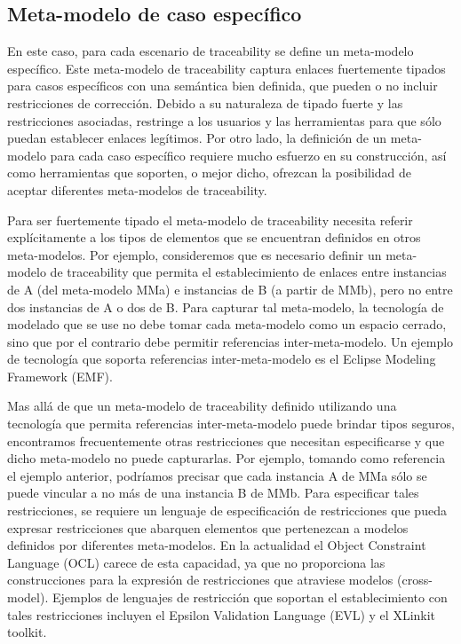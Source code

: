 \documentclass[a4paper,12pt,oneside]{book}
\begin{document}
\subsection{Meta-modelo de caso específico}

En este caso, para cada escenario de traceability se define un meta-modelo  específico. Este meta-modelo de traceability captura enlaces fuertemente tipados para casos específicos con una semántica bien definida, que pueden o no incluir restricciones de corrección. Debido a su naturaleza de tipado fuerte y las restricciones asociadas, restringe a los usuarios y las herramientas para que sólo puedan establecer enlaces legítimos. Por otro lado, la definición de un meta-modelo para cada caso específico requiere mucho esfuerzo en su construcción, así como herramientas que soporten, o mejor dicho, ofrezcan la posibilidad de aceptar diferentes meta-modelos de traceability.

Para ser fuertemente tipado el meta-modelo de traceability necesita referir explícitamente a los tipos de elementos que se encuentran definidos en otros meta-modelos. Por ejemplo, consideremos que es necesario definir un meta-modelo de traceability que permita el establecimiento de enlaces entre instancias de A (del meta-modelo MMa) e instancias de B (a partir de MMb), pero no entre dos instancias de A o dos de B. Para capturar tal meta-modelo, la tecnología de modelado que se use no debe tomar cada meta-modelo como un espacio cerrado, sino que por el contrario debe permitir referencias inter-meta-modelo. Un ejemplo de tecnología que soporta referencias inter-meta-modelo es el Eclipse Modeling Framework (EMF).

Mas allá de que un meta-modelo de traceability definido utilizando una tecnología que permita referencias inter-meta-modelo puede brindar tipos seguros, encontramos frecuentemente otras restricciones que necesitan especificarse y que dicho meta-modelo no puede capturarlas. Por ejemplo, tomando como referencia el ejemplo anterior, podríamos precisar que cada instancia A de MMa sólo se puede vincular a no más de una instancia B de MMb. Para especificar tales restricciones, se requiere un lenguaje de especificación de restricciones que pueda expresar restricciones que abarquen elementos que pertenezcan a modelos definidos por diferentes meta-modelos. En la actualidad el Object Constraint Language (OCL) carece de esta capacidad, ya que no proporciona las construcciones para la expresión de restricciones que atraviese modelos (cross-model). Ejemplos de lenguajes de restricción que soportan el establecimiento con tales restricciones incluyen el Epsilon Validation Language (EVL) y el XLinkit toolkit.
\end{document}
